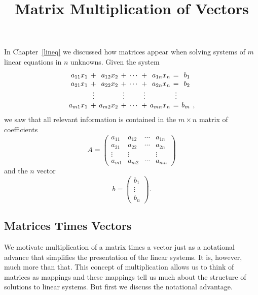 \documentclass{ximera}
\title{Matrix Multiplication of Vectors}
\begin{document}
\begin{abstract}
\end{abstract}
\maketitle

 \label{S:4.1}

In Chapter~\ref{lineq} we discussed how matrices appear when solving systems 
of $m$ linear equations in $n$ unknowns.  Given the system
\begin{equation}   \label{general2}
\arraycolsep 2pt
\begin{array}{rcrcrcrcrl}
a_{11}x_1 & + & a_{12}x_2 & + & \cdots & + & a_{1n}x_n & = & b_1 & \\
a_{21}x_1 & + & a_{22}x_2 & + & \cdots & + & a_{2n}x_n & = & b_2 & \\
    & \vdots &      & \vdots &    & \vdots &     & \vdots &   & \\
a_{m1}x_1 & + & a_{m2}x_2 & + & \cdots & + & a_{mn}x_n & = & b_m & ,
\end{array}
\end{equation}
we saw that all relevant information is contained in the $m\times n$ matrix 
of coefficients
\[
A=\left(
\begin{array}{rrrr}
 a_{11} & a_{12} & \cdots & a_{1n} \\
 a_{21} & a_{22} & \cdots & a_{2n}  \\
 \vdots & \vdots &        & \vdots  \\
 a_{m1} & a_{m2} & \cdots & a_{mn}
\end{array}
\right)
\]
and the $n$ vector
\[
b=\left(
\begin{array}{c}
b_1 \\ \vdots \\ b_n
\end{array}
\right).
\]



\subsection*{Matrices Times Vectors}

We motivate multiplication of a matrix times a vector just as a notational 
advance that simplifies the
presentation of the linear systems.  It is, however, much more
than that.  This concept of multiplication allows us to think of
matrices as mappings and these mappings tell us much about the
structure of solutions to linear systems.  But first we discuss
the notational advantage.
\end{document}
